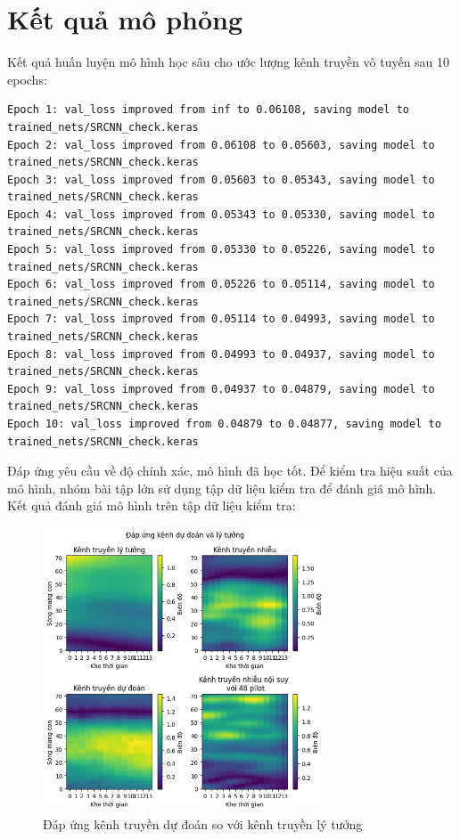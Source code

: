 \section{Kết quả mô phỏng}

Kết quả huấn luyện mô hình học sâu cho ước lượng kênh truyền vô tuyến sau 10 epochs:

\begin{lstlisting}
Epoch 1: val_loss improved from inf to 0.06108, saving model to trained_nets/SRCNN_check.keras 
Epoch 2: val_loss improved from 0.06108 to 0.05603, saving model to trained_nets/SRCNN_check.keras 
Epoch 3: val_loss improved from 0.05603 to 0.05343, saving model to trained_nets/SRCNN_check.keras 
Epoch 4: val_loss improved from 0.05343 to 0.05330, saving model to trained_nets/SRCNN_check.keras 
Epoch 5: val_loss improved from 0.05330 to 0.05226, saving model to trained_nets/SRCNN_check.keras 
Epoch 6: val_loss improved from 0.05226 to 0.05114, saving model to trained_nets/SRCNN_check.keras 
Epoch 7: val_loss improved from 0.05114 to 0.04993, saving model to trained_nets/SRCNN_check.keras 
Epoch 8: val_loss improved from 0.04993 to 0.04937, saving model to trained_nets/SRCNN_check.keras 
Epoch 9: val_loss improved from 0.04937 to 0.04879, saving model to trained_nets/SRCNN_check.keras 
Epoch 10: val_loss improved from 0.04879 to 0.04877, saving model to trained_nets/SRCNN_check.keras    
\end{lstlisting}

Đáp ứng yêu cầu về độ chính xác, mô hình đã học tốt. 
Để kiểm tra hiệu suất của mô hình, nhóm bài tập lớn sử dụng tập dữ liệu kiểm tra để đánh giá mô hình. 
Kết quả đánh giá mô hình trên tập dữ liệu kiểm tra:

\begin{figure}[H]
    \centering
    \includegraphics[width=0.75\textwidth]{../images/pred_vs_ideal.png}
    \caption{Đáp ứng kênh truyền dự đoán so với kênh truyền lý tưởng}
\end{figure}

